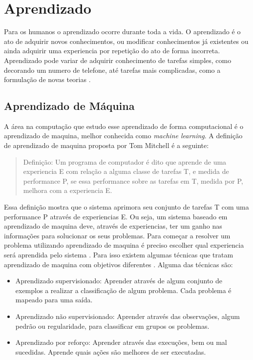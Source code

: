 \chapter{\label{chap:aprendizado}Aprendizado}
 
Para os humanos o aprendizado ocorre durante toda a vida. 
O aprendizado é o ato de adquirir novos conhecimentos, ou modificar conhecimentos já existentes ou ainda adquirir uma experiencia por repetição do ato de forma incorreta. 
Aprendizado pode variar de adquirir conhecimento de tarefas simples, como decorando um numero de telefone, até tarefas mais complicadas, como a formulação de novas teorias \cite{intelligence2003modern}. 

\section{Aprendizado de Máquina} 

A área na computação que estudo esse aprendizado de forma computacional é o aprendizado de maquina, melhor conhecida como \textit{machine learning}. A definição de aprendizado de maquina proposta por Tom Mitchell \cite{Mitchell1997ML} é a seguinte:

\begin{quote}
	Definição: Um programa de computador é dito que aprende de uma experiencia E com relação a alguma classe de tarefas T, e medida de performance P, se essa performance sobre as tarefas em T, medida por P, melhora com a experiencia E.
\end{quote}

Essa definição mostra que o sistema aprimora seu conjunto de tarefas T com uma performance P através de experiencias E. Ou seja, um sistema baseado em aprendizado de maquina deve, através de experiencias, ter um ganho nas informações para solucionar os seus problemas. Para começar a resolver um problema utilizando aprendizado de maquina é preciso escolher qual experiencia será aprendida pelo sistema \cite{Mitchell1997ML}. Para isso existem algumas técnicas que tratam aprendizado de maquina com objetivos diferentes \cite{intelligence2003modern}. Alguma das técnicas são: 
\begin{itemize}
	\item Aprendizado supervisionado: Aprender através de algum conjunto de exemplos a realizar a classificação de algum problema. Cada problema é mapeado para uma saída. 
	\item Aprendizado não supervisionado: Aprender através das observações, algum pedrão ou regularidade, para classificar em grupos os problemas.
	\item Aprendizado por reforço: Aprender através das execuções, bem ou mal sucedidas. Aprende quais ações são melhores de ser executadas.
\end{itemize}

